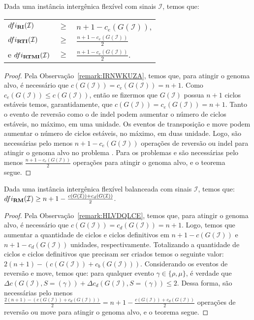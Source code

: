 \begin{theorem}\label{theorem:SZNBDWOM}
Dada uma instância intergênica flexível com sinais $\mathcal{I}$, temos que:

\begin{tabular}{lll}
  $dfi_{\textbf{RI}}(\mathcal{I})$       & $ \ge $ & ${n+1} - c_e(G(\mathcal{I} ))$, \\
  $dfi_{\textbf{RTI}}(\mathcal{I})$      & $ \ge $ & $\frac{{n+1} - c_e(G(\mathcal{I} ))}{2}$  \\
  e $dfi_{\textbf{RTMI}}(\mathcal{I})$   & $ \ge $ & $\frac{{n+1} - c_e(G(\mathcal{I} ))}{2}$. \\
\end{tabular}
\end{theorem}
\begin{proof}
Pela Observação~\ref{remark:IRNWKUZA}, temos que, para atingir o genoma alvo, é necessário que $c(G(\mathcal{I})) = c_e(G(\mathcal{I})) = n+1$. Como $c_e(G(\mathcal{I})) \le c(G(\mathcal{I}))$, então se fizermos que $G(\mathcal{I})$ possua $n+1$ ciclos estáveis temos, garantidamente, que $c(G(\mathcal{I})) = c_e(G(\mathcal{I})) = n+1$. Tanto o evento de reversão como o de indel podem aumentar o número de ciclos estáveis, no máximo, em uma unidade. Os eventos de transposição e move podem aumentar o número de ciclos estáveis, no máximo, em duas unidade. Logo, são necessárias pelo menos ${n+1} - c_e(G(\mathcal{I} ))$ operações de reversão ou indel para atingir o genoma alvo no problema \SbFIRI{}. Para os problemas \SbFIRTI{} e \SbFIRTMI{} são necessárias pelo menos $\frac{{n+1} - c_e(G(\mathcal{I} ))}{2}$ operações para atingir o genoma alvo, e o teorema segue. 
\end{proof}

\begin{theorem}\label{theorem:CNMFNKPK}
Dada uma instância intergênica flexível balanceada com sinais $\mathcal{I}$, temos que: $dfi_{\textbf{RM}}(\mathcal{I}) \ge {n+1} - \frac{c(G(\mathcal{I} )) + c_d(G(\mathcal{I} ))}{2}$.
\end{theorem}
\begin{proof}
Pela Observação~\ref{remark:HLVDQLCE}, temos que, para atingir o genoma alvo, é necessário que $c(G(\mathcal{I})) = c_d(G(\mathcal{I})) = n+1$. Logo, temos que aumentar a quantidade de ciclos e ciclos definitivos em ${n+1} - c(G(\mathcal{I}))$ e ${n+1} - c_d(G(\mathcal{I}))$ unidades, respectivamente. Totalizando a quantidade de ciclos e ciclos definitivos que precisam ser criados temos o seguinte valor: $2(n+1) - (c(G(\mathcal{I})) + c_b(G(\mathcal{I})))$. Considerando os eventos de reversão e move, temos que: para qualquer evento $\gamma \in \{\rho, \mu\}$, é verdade que $\Delta c(G(\mathcal{I}), S=(\gamma)) + \Delta c_d(G(\mathcal{I}), S=(\gamma)) \le 2$. Dessa forma, são necessárias pelo menos $\frac{2({n+1}) - (c(G(\mathcal{I})) + c_d(G(\mathcal{I})))}{2} = {n+1} - \frac{c(G(\mathcal{I} )) + c_d(G(\mathcal{I} ))}{2}$ operações de reversão ou move para atingir o genoma alvo, e o teorema segue. 
\end{proof}

